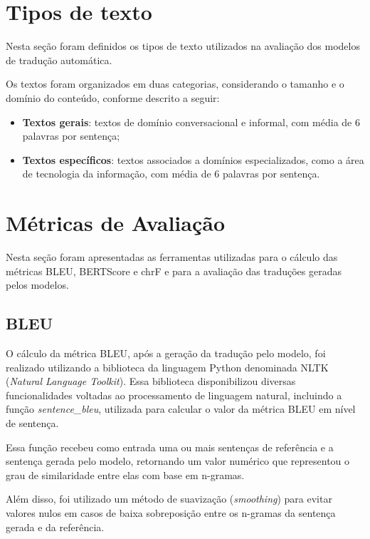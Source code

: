 \section{Tipos de texto}
\label{Text-type}
Nesta seção foram definidos os tipos de texto utilizados na avaliação dos modelos de tradução automática.

Os textos foram organizados em duas categorias, considerando o tamanho e o domínio do conteúdo, conforme descrito a seguir:

\begin{itemize}
    \item \textbf{Textos gerais}: textos de domínio conversacional e informal, com média de 6 palavras por sentença;

    \item \textbf{Textos específicos}: textos associados a domínios especializados, como a área de tecnologia da informação, com média de 6 palavras por sentença.

\end{itemize}


\section{Métricas de Avaliação}

Nesta seção foram apresentadas as ferramentas utilizadas para o cálculo das métricas BLEU, BERTScore e chrF e para a avaliação das traduções geradas pelos modelos.

\subsection{BLEU}

O cálculo da métrica BLEU, após a geração da tradução pelo modelo, foi realizado utilizando a biblioteca da linguagem Python denominada NLTK (\textit{Natural Language Toolkit}). Essa biblioteca disponibilizou diversas funcionalidades voltadas ao processamento de linguagem natural, incluindo a função \textit{sentence\_bleu}, utilizada para calcular o valor da métrica BLEU em nível de sentença.

Essa função recebeu como entrada uma ou mais sentenças de referência e a sentença gerada pelo modelo, retornando um valor numérico que representou o grau de similaridade entre elas com base em n-gramas.

Além disso, foi utilizado um método de suavização (\textit{smoothing}) para evitar valores nulos em casos de baixa sobreposição entre os n-gramas da sentença gerada e da referência.

